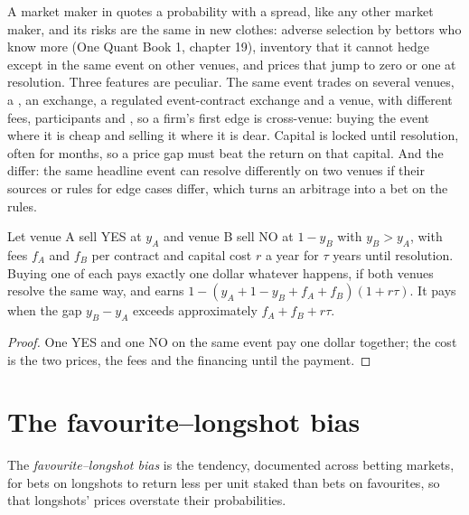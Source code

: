 A market maker in  quotes a probability with a spread, like any other market maker, and its risks are the same in new clothes: adverse
selection by bettors who know more (One Quant Book 1, chapter 19), inventory that it cannot hedge except in the same event on other venues, and prices
that jump to zero or one at resolution. Three features are peculiar. The same event trades on several venues, a , an exchange, a regulated
event-contract exchange and a  venue, with different fees, participants and , so a firm's first edge is cross-venue:
buying the event where it is cheap and selling it where it is dear. Capital is locked until resolution, often for months, so a price gap must beat the
return on that capital. And the  differ: the same headline event can resolve differently on two venues if their sources or rules for
edge cases differ, which turns an arbitrage into a bet on the rules.

\begin{proposition}\label{prop:m3:prediction-and-betting-markets:gap}
Let venue A sell YES at $y_A$ and venue B sell NO at $1 - y_B$ with $y_B > y_A$, with fees $f_A$ and $f_B$ per contract and capital cost $r$ a year for
$\tau$ years until resolution. Buying one of each pays exactly one dollar whatever happens, if both venues resolve the same way, and earns
$1 - (y_A + 1 - y_B + f_A + f_B)(1 + r\tau)$. It pays when the gap $y_B - y_A$ exceeds approximately $f_A + f_B + r\tau$.
\end{proposition}

\begin{proof}
One YES and one NO on the same event pay one dollar together; the cost is the two prices, the fees and the financing until the payment.
\end{proof}

\section{The favourite--longshot bias}

\begin{definition}\label{def:m3:prediction-and-betting-markets:flb}
The \emph{favourite--longshot bias} is the tendency, documented across betting markets, for bets on longshots to return
less per unit staked than bets on favourites, so that longshots' prices overstate their probabilities.
\end{definition}

